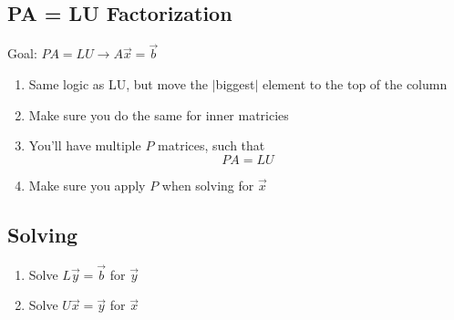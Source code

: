\documentclass[10pt]{article}
\begin{document}
\begin{multicols}{2}
\begin{minipage}{0.95\columnwidth}
    \subsection*{PA = LU Factorization}
    Goal: \(PA = LU \rightarrow A\overrightarrow{x} = \overrightarrow{b}\) \\
    \begin{enumerate}
        \item Same logic as LU, but move the \(|\)biggest\(|\) element to the top of the column
        \item Make sure you do the same for inner matricies
        \item You'll have multiple \(P\) matrices, such that
        \begin{equation*}
            PA = LU
        \end{equation*}
        \item Make sure you apply \(P\) when solving for \(\overrightarrow{x}\)
    \end{enumerate}

    \subsection*{Solving}
    \begin{enumerate}
        \item Solve \(L\overrightarrow{y} = \overrightarrow{b}\) for \(\overrightarrow{y}\)
        \item Solve \(U\overrightarrow{x} = \overrightarrow{y}\) for \(\overrightarrow{x}\)
    \end{enumerate}
\end{minipage}
\end{multicols}
\end{document}

